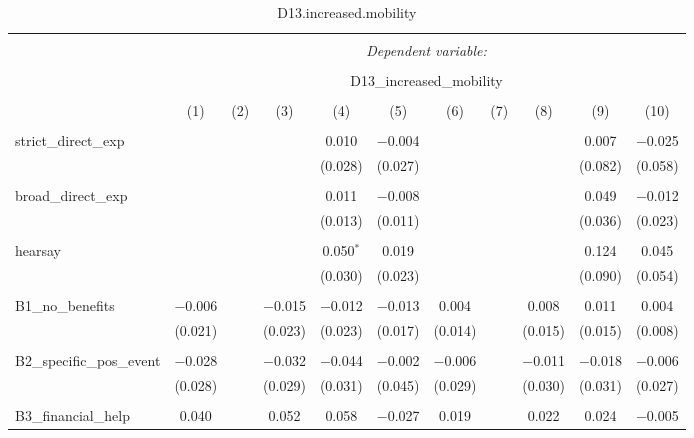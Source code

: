 
\begin{table}[H] \centering 
  \caption{D13.increased.mobility} 
  \label{} 
\tiny 
\begin{tabular}{@{\extracolsep{4pt}}lcccccccccc} 
\\[-1.8ex]\hline 
\hline \\[-1.8ex] 
 & \multicolumn{10}{c}{\textit{Dependent variable:}} \\ 
\cline{2-11} 
\\[-1.8ex] & \multicolumn{10}{c}{D13\_increased\_mobility} \\ 
\\[-1.8ex] & (1) & (2) & (3) & (4) & (5) & (6) & (7) & (8) & (9) & (10)\\ 
\hline \\[-1.8ex] 
 strict\_direct\_exp &  &  &  & 0.010 & $-$0.004 &  &  &  & 0.007 & $-$0.025 \\ 
  &  &  &  & (0.028) & (0.027) &  &  &  & (0.082) & (0.058) \\ 
  & & & & & & & & & & \\ 
 broad\_direct\_exp &  &  &  & 0.011 & $-$0.008 &  &  &  & 0.049 & $-$0.012 \\ 
  &  &  &  & (0.013) & (0.011) &  &  &  & (0.036) & (0.023) \\ 
  & & & & & & & & & & \\ 
 hearsay &  &  &  & 0.050$^{*}$ & 0.019 &  &  &  & 0.124 & 0.045 \\ 
  &  &  &  & (0.030) & (0.023) &  &  &  & (0.090) & (0.054) \\ 
  & & & & & & & & & & \\ 
 B1\_no\_benefits & $-$0.006 &  & $-$0.015 & $-$0.012 & $-$0.013 & 0.004 &  & 0.008 & 0.011 & 0.004 \\ 
  & (0.021) &  & (0.023) & (0.023) & (0.017) & (0.014) &  & (0.015) & (0.015) & (0.008) \\ 
  & & & & & & & & & & \\ 
 B2\_specific\_pos\_event & $-$0.028 &  & $-$0.032 & $-$0.044 & $-$0.002 & $-$0.006 &  & $-$0.011 & $-$0.018 & $-$0.006 \\ 
  & (0.028) &  & (0.029) & (0.031) & (0.045) & (0.029) &  & (0.030) & (0.031) & (0.027) \\ 
  & & & & & & & & & & \\ 
 B3\_financial\_help & 0.040 &  & 0.052 & 0.058 & $-$0.027 & 0.019 &  & 0.022 & 0.024 & $-$0.005 \\ 

\end{tabular}
\end{table}
